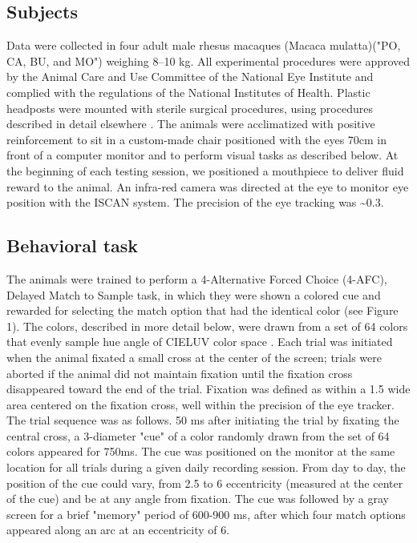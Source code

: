 \documentclass[9pt,biorxiv,lineno,onehalfspacing]{lapreprint}
\begin{document}
\begin{refsection}
\newpage

\subsection{Subjects}

Data were collected in four adult male rhesus macaques (Macaca mulatta)("PO, CA, BU, and MO") weighing 8–10 kg. 
All experimental procedures were approved by the Animal Care and Use Committee of the National Eye Institute and complied with the regulations of the National Institutes of Health. 
Plastic headposts were mounted with sterile surgical procedures, using procedures described in detail elsewhere \citep{lafer-sousa_parallel_2013}. 
The animals were acclimatized with positive reinforcement to sit in a custom-made chair positioned with the eyes 70cm in front of a computer monitor and to perform visual tasks as described below. 
At the beginning of each testing session, we positioned a mouthpiece to deliver fluid reward to the animal. 
An infra-red camera was directed at the eye to monitor eye position with the ISCAN system. 
The precision of the eye tracking was \textasciitilde0.3\degree{}. 

\subsection{Behavioral task}

The animals were trained to perform a 4-Alternative Forced Choice (4-AFC), Delayed Match to Sample task, in which they were shown a colored cue and rewarded for selecting the match option that had the identical color (see Figure 1). 
The colors, described in more detail below, were drawn from a set of 64 colors that evenly sample hue angle of CIELUV color space \citep{stockman_colorimetry_2010}. 
Each trial was initiated when the animal fixated a small cross at the center of the screen; trials were aborted if the animal did not maintain fixation until the fixation cross disappeared toward the end of the trial. 
Fixation was defined as within a 1.5\degree{} wide area centered on the fixation cross, well within the precision of the eye tracker.
The trial sequence was as follows. 
50 ms after initiating the trial by fixating the central cross, a 3\degree{}-diameter "cue"  of a color randomly drawn from the set of 64 colors appeared for 750ms. 
The cue was positioned on the monitor at the same location for all trials during a given daily recording session.
From day to day, the position of the cue could vary, from 2.5\degree{} to 6\degree{} eccentricity (measured at the center of the cue) and be at any angle from fixation.
The cue was followed by a gray screen for a brief "memory" period of 600-900 ms, after which four match options appeared along an arc at an eccentricity of 6\degree{}. 


\end{refsection}
\end{document}
